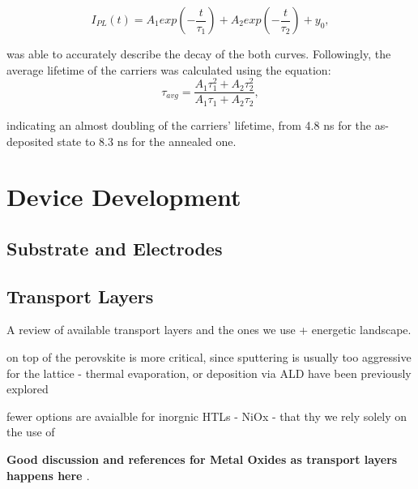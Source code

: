 \begin{equation}
    I_{PL}(t) = A_1exp(-\frac{t}{\tau_1}) + A_2exp(-\frac{t}{\tau_2}) + y_0,
\end{equation}

was able to accurately describe the decay of the both curves. Followingly, the average lifetime of the carriers was calculated using the equation: 
\begin{equation}
    \tau_{avg} = \frac{A_1 \tau_1^2 + A_2 \tau_2^2}{A_1 \tau_1 + A_2 \tau_2},
\end{equation}

indicating an almost doubling of the carriers' lifetime, from 4.8 ns for the as-deposited state to 8.3 ns for the annealed one.


\section{Device Development}

\subsection{Substrate and Electrodes}

\subsection{Transport Layers}

A review of available transport layers and the ones we use + energetic landscape.

on top of the perovskite is more critical, since sputtering is usually too aggressive for the lattice - thermal evaporation, or deposition via ALD have been previously explored 

fewer options are avaialble for inorgnic HTLs - NiOx - that thy we rely solely on the use of 


\textbf{Good discussion and references for Metal Oxides as transport layers happens here \cite{Yang2023InvertedPassivation}}.






